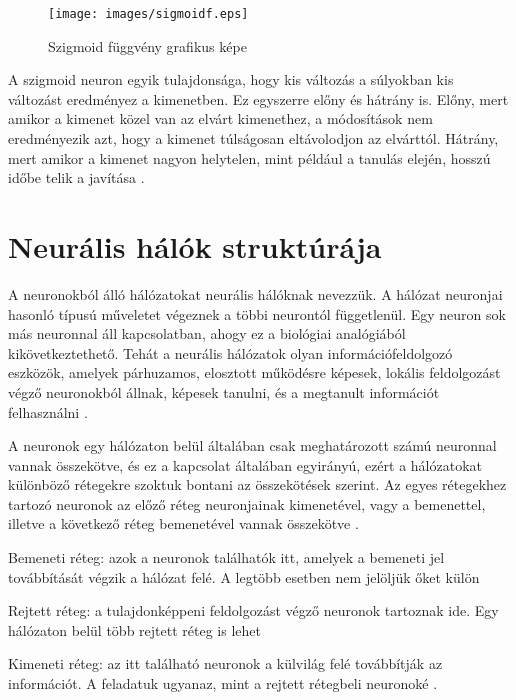 \begin{figure}[h]
\centering

\texttt{[image: images/sigmoidf.eps]}
\caption{Szigmoid függvény grafikus képe}

\label{fig:sigmoidf}
\end{figure}

A szigmoid neuron egyik tulajdonsága, hogy kis változás a súlyokban kis változást eredményez a kimenetben. Ez egyszerre előny és hátrány is. Előny, mert amikor a kimenet közel van az elvárt kimenethez, a módosítások nem eredményezik azt, hogy a kimenet túlságosan eltávolodjon az elvárttól. Hátrány, mert amikor a kimenet nagyon helytelen, mint például a tanulás elején, hosszú időbe telik a javítása \cite{5}.

\section{Neurális hálók struktúrája}\label{sec:INTRO:architecture}

A neuronokból álló hálózatokat neurális hálóknak nevezzük. A hálózat neuronjai hasonló típusú műveletet végeznek a többi neurontól függetlenül. Egy neuron sok más neuronnal áll kapcsolatban, ahogy ez a biológiai analógiából kikövetkeztethető. Tehát a neurális hálózatok olyan információfeldolgozó eszközök, amelyek párhuzamos, elosztott működésre képesek, lokális feldolgozást végző neuronokból állnak, képesek tanulni, és a megtanult információt felhasználni \cite{10}.

A neuronok egy hálózaton belül általában csak meghatározott számú neuronnal vannak összekötve, és ez a kapcsolat általában egyirányú, ezért a hálózatokat különböző rétegekre szoktuk bontani az összekötések szerint. Az egyes rétegekhez tartozó neuronok az előző réteg neuronjainak kimenetével, vagy a bemenettel, illetve a következő réteg bemenetével vannak összekötve \cite{10}.


\begin{compactenum}
	\item Bemeneti réteg: azok a neuronok találhatók itt, amelyek a bemeneti jel továbbítását végzik a hálózat felé. A legtöbb esetben nem jelöljük őket külön
	\item Rejtett réteg: a tulajdonképpeni feldolgozást végző neuronok tartoznak ide. Egy hálózaton belül több rejtett réteg is lehet
	\item Kimeneti réteg: az itt található neuronok a külvilág felé továbbítják az információt. A feladatuk ugyanaz, mint a rejtett rétegbeli neuronoké \cite{10}.
\end{compactenum}


